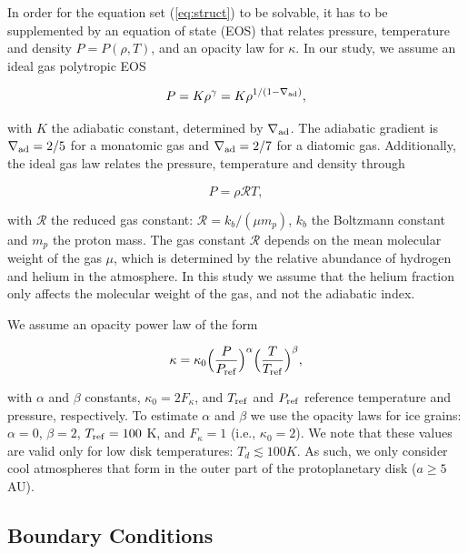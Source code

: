 \documentclass[apj]{emulateapj}
\newcommand{\delad}{\nabla_{\rm ad}}
\begin{document}
In order for the equation set (\ref{eq:struct}) to be solvable, it has to be supplemented by an equation of state (EOS) that relates pressure, temperature and density $P=P(\rho, T)$, and an opacity law for $\kappa$. In our study, we assume an ideal gas polytropic EOS 

\begin{equation}
\label{eq:polyEOS}
P=K \rho^{\gamma}=K \rho^{1/(1-\delad)},
\end{equation}

\noindent with $K$ the adiabatic constant, determined by $\delad$. The adiabatic gradient is $\delad=2/5$ for a monatomic gas and $\delad=2/7$ for a diatomic gas. Additionally, the ideal gas law relates the pressure, temperature and density through

\begin{equation}
\label{eq:idealgas}
P=\rho \mathcal{R} T,
\end{equation}

\noindent with  $\mathcal{R}$ the reduced gas constant: $\mathcal{R}=k_b/(\mu m_p)$, $k_b$ the Boltzmann constant and $m_p$ the proton mass. The gas constant $\mathcal{R}$ depends on the mean molecular weight of the gas $\mu$, which is determined by the relative abundance of hydrogen and helium in the atmosphere. In this study we assume that the helium fraction only affects the molecular weight of the gas, and not the adiabatic index.%

We assume an opacity power law of the form

\begin{equation}
\label{eq:opacitylaw}
\kappa=\kappa_0 \Big(\frac{P}{P_{\rm{ref}}}\Big)^{\alpha} \Big(\frac{T}{T_{\rm{ref}}}\Big)^{\beta},
\end{equation}  

\noindent with $\alpha$ and $\beta$ constants, $\kappa_0=2 F_{\kappa}$, and $T_{\rm{ref}}$ and $P_{\rm{ref}}$ reference temperature and pressure, respectively. To estimate $\alpha$ and $\beta$ we use the \citet{bell94} opacity laws for ice grains: $\alpha =0 $, $\beta=2$, $T_{\rm{ref}}=100$ K, and $F_{\kappa}=1$ (i.e., $\kappa_0=2$). We note that these values are valid only for low disk temperatures: $T_d \lesssim 100 K$. As such, we only consider cool atmospheres that form in the outer part of the protoplanetary disk ($a \geq 5$ AU).

\subsection{Boundary Conditions}
\label{BCs}
\end{document}

